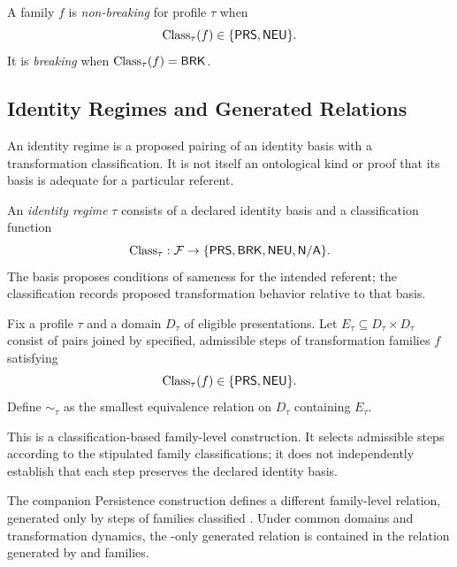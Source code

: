 \begin{definition}
  \label{se200.def.NonBreakingTransformation}
  A family $f$ is \emph{non-breaking} for profile $\tau$ when
  \[
    \mathrm{Class}_\tau(f)\in\{\textsf{PRS},\textsf{NEU}\}.
  \]
  It is \emph{breaking} when $\mathrm{Class}_\tau(f)=\textsf{BRK}$.
\end{definition}

\subsection{Identity Regimes and Generated Relations}
\label{subsec:identity_regimes}

An identity regime is a proposed pairing of an identity basis with a
transformation classification.
It is not itself an ontological kind
or proof that its basis is adequate for a particular referent.

\begin{definition}
  \label{se200.def.IdentityRegime}
  An \emph{identity regime} $\tau$ consists of a declared identity basis
  and a classification function
  \[
    \mathrm{Class}_\tau:\mathcal{F}\to\{\textsf{PRS},\textsf{BRK},\textsf{NEU},\textsf{N/A}\}.
  \]
  The basis proposes conditions of sameness for the intended referent;
  the classification records proposed transformation behavior relative
  to that basis.
\end{definition}

\begin{definition}
  \label{se200.def.InducedIdentityRelation}
  Fix a profile $\tau$ and a domain $D_\tau$ of eligible presentations.
  Let $E_\tau\subseteq D_\tau\times D_\tau$ consist of pairs joined
  by specified, admissible steps of transformation families $f$
  satisfying
  \[
    \mathrm{Class}_\tau(f)\in\{\textsf{PRS},\textsf{NEU}\}.
  \]
  Define $\sim_\tau$ as the smallest equivalence relation
  on $D_\tau$ containing $E_\tau$.
\end{definition}

This is a classification-based family-level construction.
It selects admissible steps according to the stipulated family
classifications; it does not independently establish that each
step preserves the declared identity basis.

The companion Persistence construction defines a different
family-level relation, generated only by steps of families
classified \PRS{}.
Under common domains and transformation dynamics, the
\PRS{}-only generated relation is contained in the relation
generated by \PRS{} and \NEU{} families.

